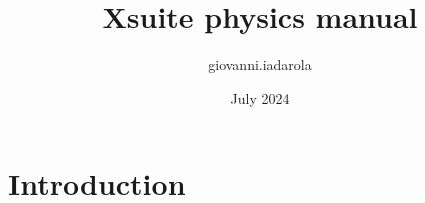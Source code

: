 \documentclass{article}
\title{Xsuite physics manual}
\author{giovanni.iadarola }
\date{July 2024}
\begin{document}
\maketitle

\section{Introduction}
\end{document}
